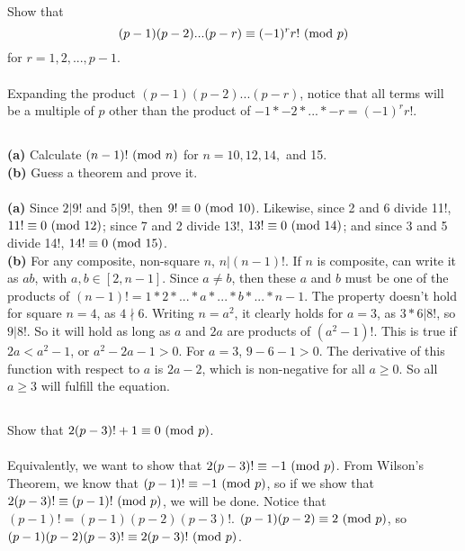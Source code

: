 \documentclass{article}
\begin{document}
\subsection{}
Show that
\begin{equation*}
    (p - 1)(p - 2)...(p - r) \equiv (-1)^rr! \ (\mathrm{mod}\ p)
\end{equation*}
for $r = 1, 2, ..., p - 1$.\\~\\
Expanding the product $(p - 1)(p - 2)...(p - r)$,
notice that all terms will be a multiple of $p$ other than the product
of $-1 * -2 * ... * -r = (-1)^rr!$.

\subsection{}
\textbf{(a)} Calculate $(n - 1)! \ (\mathrm{mod}\ n)$ for $n = 10, 12, 14,$ and 15.\\
\textbf{(b)} Guess a theorem and prove it.\\~\\
\textbf{(a)} Since $2|9!$ and $5|9!$, then $9! \equiv 0 \ (\mathrm{mod}\ 10)$.
Likewise, since 2 and 6 divide 11!, $11! \equiv 0 \ (\mathrm{mod}\ 12)$;
since 7 and 2 divide 13!, $13! \equiv 0 \ (\mathrm{mod}\ 14)$;
and since 3 and 5 divide 14!, $14! \equiv 0 \ (\mathrm{mod}\ 15)$.\\
\textbf{(b)} For any composite, non-square $n$, $n|(n - 1)!$.
If $n$ is composite, can write it as $ab$, with $a, b \in [2, n - 1]$.
Since $a \neq b$, then these $a$ and $b$ must be one of the products of
$(n - 1)! = 1 * 2 * ... * a * ... * b * ... * n - 1$.
The property doesn't hold for square $n = 4$, as $4 \nmid 6$.
Writing $n = a^2$, it clearly holds for $a = 3$, as $3*6|8!$, so $9|8!$.
So it will hold as long as $a$ and $2a$ are products of $(a^2 - 1)!$.
This is true if $2a < a^2 - 1$, or $a^2 - 2a - 1 > 0$.
For $a = 3$, $9 - 6 - 1 > 0$.
The derivative of this function with respect to $a$ is $2a - 2$, which is
non-negative for all $a \geq 0$.
So all $a \geq 3$ will fulfill the equation.

\subsection{}
Show that $2(p - 3)! + 1 \equiv 0 \ (\mathrm{mod}\ p)$.\\~\\
Equivalently, we want to show that $2(p - 3)! \equiv -1 \ (\mathrm{mod}\ p)$.
From Wilson's Theorem, we know that $(p - 1)! \equiv -1 \ (\mathrm{mod}\ p)$,
so if we show that $2(p - 3)! \equiv (p - 1)! \ (\mathrm{mod}\ p)$, we will be done.
Notice that $(p - 1)! = (p - 1)(p - 2)(p - 3)!$.
$(p - 1)(p - 2) \equiv 2 \ (\mathrm{mod}\ p)$, so
$(p - 1)(p - 2)(p - 3)! \equiv 2(p - 3)! \ (\mathrm{mod}\ p)$.
\end{document}
